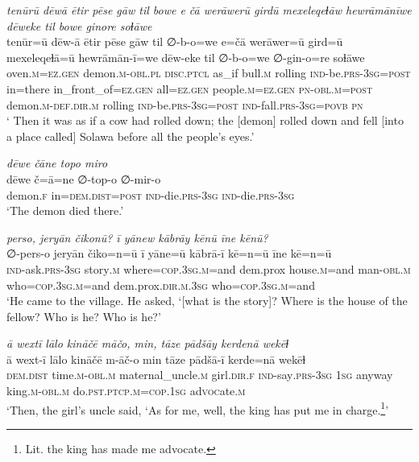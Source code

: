 \ea \label{ŽP.201}
\textit{tenūrū dēwā ētir pēse gāw til bowe e čā werāwerū girdū mexeleqeɫāw hewrāmānīwe dēweke til bowe ginore soɫāwe} \\ 
\gll tenūr=ū dēw-ā ētir pēse gāw til ∅-b-o=we e=čā werāwer=ū gird=ū mexeleqeɫā=ū hewrāmān-ī=we dēw-eke til ∅-b-o=we ∅-gin-o=re soɫāwe \\ 
 oven\textsc{.m}\textsc{\textsc{=ez.gen}} demon\textsc{.m}\textsc{-obl}\textsc{.pl} \textsc{disc.ptcl} as\_if bull\textsc{.m} rolling \textsc{ind-}be\textsc{.prs}\textsc{-3sg}\textsc{=\textsc{post}} in=there in\_front\_of\textsc{\textsc{=ez.gen}} all\textsc{\textsc{=ez.gen}} people\textsc{.m}\textsc{\textsc{=ez.gen}} \textsc{pn}\textsc{-obl}\textsc{.m}\textsc{=\textsc{post}} demon\textsc{.m}\textsc{-def}\textsc{.dir}\textsc{.m} rolling \textsc{ind-}be\textsc{.prs}\textsc{-3sg}\textsc{=\textsc{post}} \textsc{ind-}fall\textsc{.prs}\textsc{-3sg}\textsc{=\textsc{povb}} \textsc{pn} \\ 
\glt ` Then it was as if a cow had rolled down; the [demon] rolled down and fell [into a place called] Solawa before all the people’s eyes.'
\z 
 
\ea \label{ŽP.202}
\textit{dēwe čāne topo miro} \\ 
\gll dēwe č=ā=ne ∅-top-o ∅-mir-o \\ 
 demon\textsc{.f} in=\textsc{dem.dist}\textsc{=\textsc{post}} \textsc{ind-}die\textsc{.prs}\textsc{-3sg} \textsc{ind-}die\textsc{.prs}\textsc{-3sg} \\ 
\glt `The demon died there.'
\z 
 
\ea \label{ŽP.204}
\textit{perso, jeryān čikonū? ī yānew kābrāy kēnū īne kēnū?} \\ 
\gll ∅-pers-o jeryān čiko=n=ū ī yāne=ū kābrā-ī kē=n=ū īne kē=n=ū \\ 
 \textsc{ind-}ask\textsc{.prs}\textsc{-3sg} story\textsc{.m} where\textsc{=cop}\textsc{.3sg}\textsc{.m}=and dem.prox house\textsc{.m}=and man\textsc{-obl}\textsc{.m} who\textsc{=cop}\textsc{.3sg}\textsc{.m}=and dem.prox\textsc{.dir}\textsc{.m}\textsc{.3sg} who\textsc{=cop}\textsc{.3sg}\textsc{.m}=and \\ 
\glt `He came to the village. He asked, ‘[what is the story]? Where is the house of the fellow? Who is he? Who is he?'
\z 
 
\ea \label{ŽP.206}
\textit{ā wextī lālo kināčē māčo, min, tāze pādšāy kerdenā wekēɫ} \\ 
\gll ā wext-ī lālo kināčē m-āč-o min tāze pādšā-ī kerde=nā wekēɫ \\ 
 \textsc{dem.dist} time\textsc{.m}\textsc{-obl}\textsc{.m} maternal\_uncle\textsc{.m} girl\textsc{.dir}\textsc{.f} \textsc{ind-}say\textsc{.prs}\textsc{-3sg} \textsc{1sg} anyway king\textsc{.m}\textsc{-obl}\textsc{.m} do\textsc{.pst}\textsc{.ptcp}\textsc{.m}\textsc{=cop}\textsc{.\textsc{1sg}} ad\textsc{voc}ate\textsc{.m} \\ 
\glt `Then, the girl’s uncle said, ‘As for me, well, the king has put me in charge.\footnote{Lit. the king has made me advocate.}'
\z 
 
